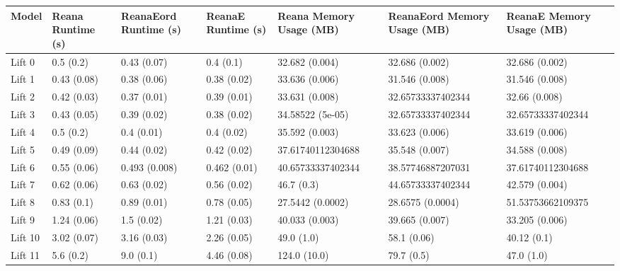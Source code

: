 \begin{tabular}{lllllll}
\toprule
  Model & Reana Runtime (s) & ReanaEord Runtime (s) & ReanaE Runtime (s) & Reana Memory Usage (MB) & ReanaEord Memory Usage (MB) & ReanaE Memory Usage (MB) \\
\midrule
 Lift 0 &         0.5 (0.2) &           0.43 (0.07) &          0.4 (0.1) &          32.682 (0.004) &              32.686 (0.002) &           32.686 (0.002) \\
 Lift 1 &       0.43 (0.08) &           0.38 (0.06) &        0.38 (0.02) &          33.636 (0.006) &              31.546 (0.008) &           31.546 (0.008) \\
 Lift 2 &       0.42 (0.03) &           0.37 (0.01) &        0.39 (0.01) &          33.631 (0.008) &           32.65733337402344 &            32.66 (0.008) \\
 Lift 3 &       0.43 (0.05) &           0.39 (0.02) &        0.38 (0.02) &        34.58522 (5e-05) &           32.65733337402344 &        32.65733337402344 \\
 Lift 4 &         0.5 (0.2) &            0.4 (0.01) &         0.4 (0.02) &          35.592 (0.003) &              33.623 (0.006) &           33.619 (0.006) \\
 Lift 5 &       0.49 (0.09) &           0.44 (0.02) &        0.42 (0.02) &       37.61740112304688 &              35.548 (0.007) &           34.588 (0.008) \\
 Lift 6 &       0.55 (0.06) &         0.493 (0.008) &       0.462 (0.01) &       40.65733337402344 &           38.57746887207031 &        37.61740112304688 \\
 Lift 7 &       0.62 (0.06) &           0.63 (0.02) &        0.56 (0.02) &              46.7 (0.3) &           44.65733337402344 &           42.579 (0.004) \\
 Lift 8 &        0.83 (0.1) &           0.89 (0.01) &        0.78 (0.05) &        27.5442 (0.0002) &            28.6575 (0.0004) &        51.53753662109375 \\
 Lift 9 &       1.24 (0.06) &            1.5 (0.02) &        1.21 (0.03) &          40.033 (0.003) &              39.665 (0.007) &           33.205 (0.006) \\
Lift 10 &       3.02 (0.07) &           3.16 (0.03) &        2.26 (0.05) &              49.0 (1.0) &                 58.1 (0.06) &              40.12 (0.1) \\
Lift 11 &         5.6 (0.2) &             9.0 (0.1) &        4.46 (0.08) &            124.0 (10.0) &                  79.7 (0.5) &               47.0 (1.0) \\

\end{tabular}

